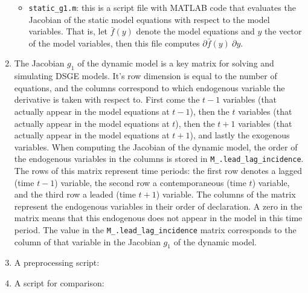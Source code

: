 \begin{enumerate}
\begin{itemize}
  \item
  \texttt{static\_g1.m}: this is a script file with MATLAB code that evaluates the Jacobian of the static model equations
	with respect to the model variables.
  That is, let \(\bar{f}(y)\) denote the model equations and \(y\) the vector of the model variables,
	then this file computes \(\partial \bar{f}(y) \ \partial y\).
\end{itemize}

\item
The Jacobian \(g_1\) of the dynamic model is a key matrix for solving and simulating DSGE models.
It's row dimension is equal to the number of equations,
  and the columns correspond to which endogenous variable the derivative is taken with respect to.
First come the \(t-1\) variables (that actually appear in the model equations at \(t-1\)),
  then the \(t\) variables (that actually appear in the model equations at \(t\)),
  then the \(t+1\) variables (that actually appear in the model equations at \(t+1\)),
  and lastly the exogenous variables.
When computing the Jacobian of the dynamic model,
  the order of the endogenous variables in the columns is stored in \texttt{M\_.lead\_lag\_incidence}.
The rows of this matrix represent time periods: the first row denotes a lagged (time \(t-1\)) variable,
  the second row a contemporaneous (time \(t\)) variable,
  and the third row a leaded (time \(t+1\)) variable.
The columns of the matrix represent the endogenous variables in their order of declaration.
A zero in the matrix means that this endogenous does not appear in the model in this time period.
The value in the \texttt{M\_.lead\_lag\_incidence} matrix
  corresponds to the column of that variable in the Jacobian \(g_1\) of the dynamic model.

\item
A preprocessing script:


\item
A script for comparison:


\end{enumerate}
